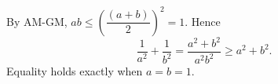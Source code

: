 By AM-GM, $ab\le(\dfrac{(a+b)}{2})^2=1$. Hence
\[
\dfrac{1}{a^2}+\dfrac{1}{b^2}=\dfrac{a^2+b^2}{a^2b^2}\ge a^2+b^2.
\]
Equality holds exactly when $a=b=1$.
